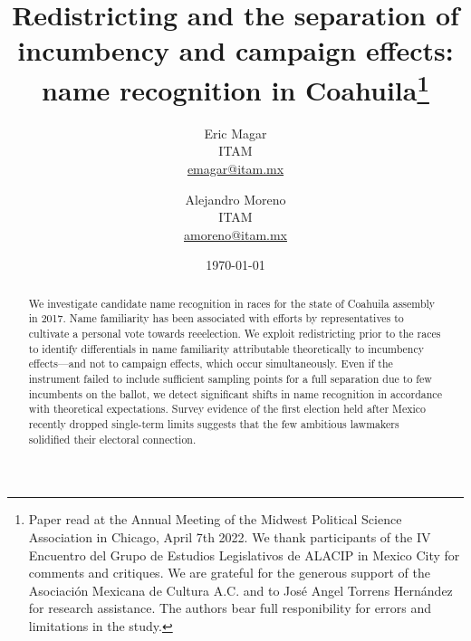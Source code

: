 \documentclass[letter,12pt]{article}
\begin{document}

\title{Redistricting and the separation of incumbency and campaign effects: name recognition in Coahuila\thanks{Paper read at the Annual Meeting of the Midwest Political Science Association in Chicago, April 7th 2022. We thank participants of the IV Encuentro del Grupo de Estudios Legislativos de ALACIP in Mexico City for comments and critiques. We are grateful for the generous support of the Asociación Mexicana de Cultura A.C. and to José Angel Torrens Hernández for research assistance. The authors bear full responibility for errors and limitations in the study.}}
\author{Eric Magar  \\ ITAM \\ \url{emagar@itam.mx} \and
        Alejandro Moreno \\ ITAM \\ \url{amoreno@itam.mx} 
}
\date{\today}
\maketitle


\begin{abstract}
\noindent We investigate candidate name recognition in races for the state of Coahuila assembly in 2017. Name familiarity has been associated with efforts by representatives to cultivate a personal vote towards reeelection. We exploit redistricting prior to the races to identify differentials in name familiarity attributable theoretically to incumbency effects---and not to campaign effects, which occur simultaneously. Even if the instrument failed to include sufficient sampling points for a full separation due to few incumbents on the ballot, we detect significant shifts in name recognition in accordance with theoretical expectations. Survey evidence of the first election held after Mexico recently dropped single-term limits suggests that the few ambitious lawmakers solidified their electoral connection.
\end{abstract}
\end{document}
